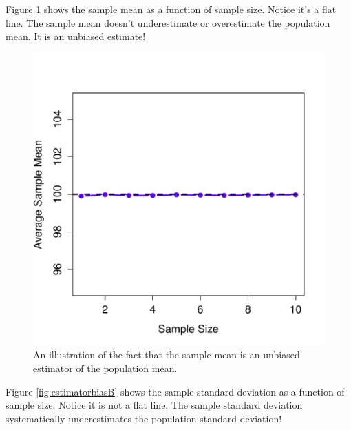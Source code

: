 \documentclass[
]{book}
\begin{document}
Figure \ref{fig:estimatorbiasA} shows the sample mean as a function of sample size. Notice it's a flat line. The sample mean doesn't underestimate or overestimate the population mean. It is an unbiased estimate!

\begin{figure}
\centering
\includegraphics{navarro_img/estimation/biasMean-eps-converted-to.pdf}
\caption{\label{fig:estimatorbiasA}An illustration of the fact that the sample mean is an unbiased estimator of the population mean.}
\end{figure}

Figure \ref{fig:estimatorbiasB} shows the sample standard deviation as a function of sample size. Notice it is not a flat line. The sample standard deviation systematically underestimates the population standard deviation!
\end{document}
